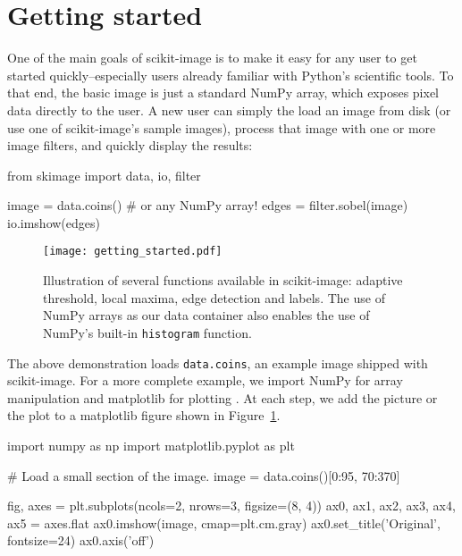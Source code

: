 
\section*{Getting started}
  \label{sec:getting-started}

  One of the main goals of scikit-image is to make it easy for any user to get started quickly--especially users already familiar with Python's scientific tools. To that end, the basic image is just a standard NumPy array, which exposes pixel data directly to the user. A new user can simply the load an image from disk (or use one of scikit-image's sample images), process that image with one or more image filters, and quickly display the results:

  \begin{pyverbatim}
    from skimage import data, io, filter

    image = data.coins()  # or any NumPy array!
    edges = filter.sobel(image)
    io.imshow(edges)
  \end{pyverbatim}

  \begin{figure}
    \texttt{[image: getting\_started.pdf]}

    \caption[Getting started figure]{\label{fig:gettingstarted}Illustration of several functions available in scikit-image: adaptive threshold, local maxima, edge detection and labels. The use of NumPy arrays as our data container also enables the use of NumPy's built-in \texttt{histogram} function.}
  \end{figure}

  The above demonstration loads \texttt{data.coins}, an example image shipped with scikit-image.  For a more complete example, we import NumPy for array manipulation and matplotlib for plotting \citep{numpy,matplotlib}.  At each step, we add the picture or the plot to a matplotlib figure shown in Figure~\ref{fig:gettingstarted}.

  \begin{pyverbatim}
    import numpy as np
    import matplotlib.pyplot as plt

    # Load a small section of the image.
    image = data.coins()[0:95, 70:370]

    fig, axes = plt.subplots(ncols=2, nrows=3,
                             figsize=(8, 4))
    ax0, ax1, ax2, ax3, ax4, ax5  = axes.flat
    ax0.imshow(image, cmap=plt.cm.gray)
    ax0.set_title('Original', fontsize=24)
    ax0.axis('off')
  \end{pyverbatim}

